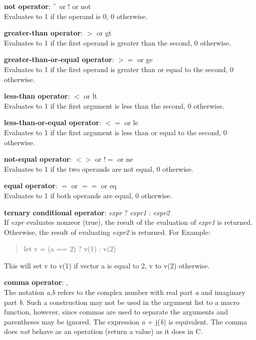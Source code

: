 \begin{description}
\item{{\bf not operator}: {\vt $\symbol{126}$} or {\vt !} or {\vt not}}\\
Evaluates to 1 if the operand is 0, 0 otherwise.

\item{{\bf greater-than operator}: {\vt $>$} or {\vt gt}}\\
Evaluates to 1 if the first operand is greater than the second, 0
otherwise.

\item{{\bf greater-than-or-equal operator}: {\vt $>=$} or {\vt ge}}\\
Evaluates to 1 if the first operand is greater than or equal to
the second, 0 otherwise.

\item{{\bf less-than operator}: {\vt $<$} or {\vt lt}}\\
Evaluates to 1 if the first argument is less than the second, 0
otherwise.

\item{{\bf less-than-or-equal operator}: {\vt $<=$} or {\vt le}}\\
Evaluates to 1 if the first argument is less than or equal to the
second, 0 otherwise.

\item{{\bf not-equal operator}: {\vt $<>$} or {\vt $!=$} or {\vt ne}}\\
Evaluates to 1 if the two operands are not equal, 0 otherwise.

\item{{\bf equal operator}: {\vt $=$} or {\vt $==$} or {\vt eq}}\\
Evaluates to 1 if both operands are equal, 0 otherwise.

\item{{\bf ternary conditional operator}:
      {\it expr} {\vt ?} {\it expr1} {\vt :} {\it expr2}}\\
If {\it expr} evaluates nonzeor (true), the result of the evaluation
of {\it expr1} is returned.  Otherwise, the result of evaluating
{\it expr2} is returned.  For Example:
\begin{quote}
\vt let v = (a == 2) ? v(1) : v(2)
\end{quote}
This will set {\vt v} to {\vt v(1)} if vector {\vt a} is equal to 2,
{\vt v} to {\vt v(2)} otherwise.

\item{{\bf comma operator}: {\vt ,}}\\
The notation {\it a\/},{\it b} refers to the complex number with real
part {\it a} and imaginary part {\it b}.  Such a construction may not
be used in the argument list to a macro function, however, since
commas are used to separate the arguments and parentheses may be
ignored.  The expression {\it a} + {\vt j}({\it b\/}) is equivalent. 
The comma does {\it not} behave as an operation (return a value) as it
does in C.
\end{description}

